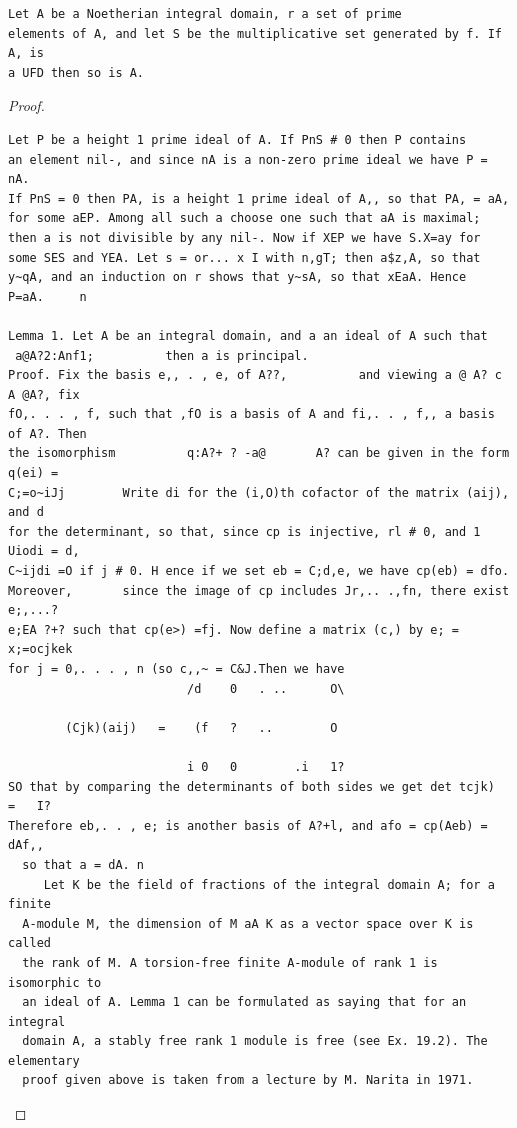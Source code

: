 \begin{theorem}\label{mcrt-auto-theorem-20-2}\uses{}
\begin{verbatim}
Let A be a Noetherian integral domain, r a set of prime
elements of A, and let S be the multiplicative set generated by f. If A, is
a UFD then so is A.
\end{verbatim}
\end{theorem}
\begin{proof}
\begin{verbatim}
Let P be a height 1 prime ideal of A. If PnS # 0 then P contains
an element nil-, and since nA is a non-zero prime ideal we have P = nA.
If PnS = 0 then PA, is a height 1 prime ideal of A,, so that PA, = aA,
for some aEP. Among all such a choose one such that aA is maximal;
then a is not divisible by any nil-. Now if XEP we have S.X=ay for
some SES and YEA. Let s = or... x I with n,gT; then a$z,A, so that
y~qA, and an induction on r shows that y~sA, so that xEaA. Hence
P=aA.     n

Lemma 1. Let A be an integral domain, and a an ideal of A such that
 a@A?2:Anf1;          then a is principal.
Proof. Fix the basis e,, . , e, of A??,          and viewing a @ A? c A @A?, fix
fO,. . . , f, such that ,fO is a basis of A and fi,. . , f,, a basis of A?. Then
the isomorphism          q:A?+ ? -a@       A? can be given in the form q(ei) =
C;=o~iJj        Write di for the (i,O)th cofactor of the matrix (aij), and d
for the determinant, so that, since cp is injective, rl # 0, and 1 Uiodi = d,
C~ijdi =O if j # 0. H ence if we set eb = C;d,e, we have cp(eb) = dfo.
Moreover,       since the image of cp includes Jr,.. .,fn, there exist e;,...?
e;EA ?+? such that cp(e>) =fj. Now define a matrix (c,) by e; = x;=ocjkek
for j = 0,. . . , n (so c,,~ = C&J.Then we have
                         /d    0   . ..      O\

        (Cjk)(aij)   =    (f   ?   ..        O

                         i 0   0        .i   1?
SO that by comparing the determinants of both sides we get det tcjk)       =   I?
Therefore eb,. . , e; is another basis of A?+l, and afo = cp(Aeb) = dAf,,
  so that a = dA. n
     Let K be the field of fractions of the integral domain A; for a finite
  A-module M, the dimension of M aA K as a vector space over K is called
  the rank of M. A torsion-free finite A-module of rank 1 is isomorphic to
  an ideal of A. Lemma 1 can be formulated as saying that for an integral
  domain A, a stably free rank 1 module is free (see Ex. 19.2). The elementary
  proof given above is taken from a lecture by M. Narita in 1971.
\end{verbatim}
\end{proof}


